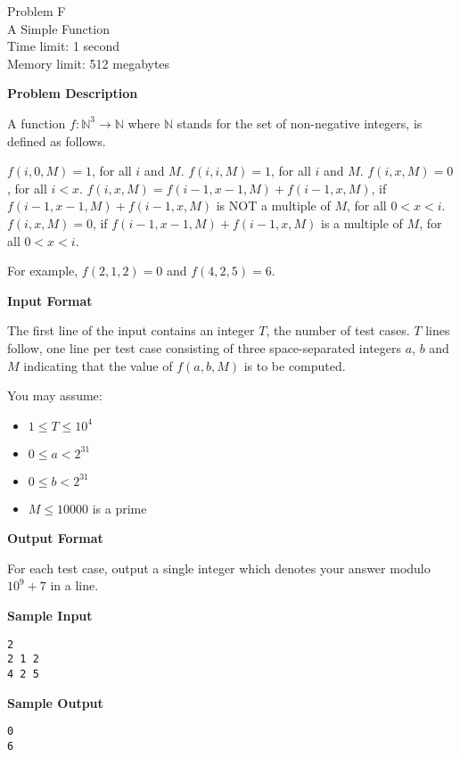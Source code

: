 \begin{center}
    {\LARGE Problem F}\vspace{1mm}\\
    {\Large A Simple Function}\\
    {Time limit: 1 second}\\
    {Memory limit: 512 megabytes}
\end{center}

\textbf{\large Problem Description}

A function $f:\mathbb{N}^{3} \to \mathbb{N}$ where $\mathbb{N}$ stands for the set of non-negative integers, is defined as follows.

\begin{outline}
	\1 $f(i, 0, M)=1$, for all $i$ and $M$.
	\1 $f(i, i, M)=1$, for all $i$ and $M$.
	\1 $f(i, x, M)=0$, for all $i < x$.
	\1 $f(i, x, M)=f(i-1, x-1, M)+f(i-1, x, M)$, if $f(i-1, x-1, M)+f(i-1, x, M)$ is NOT a multiple of $M$, for all $0 < x < i$.
	\1 $f(i, x, M)=0$, if $f(i-1, x-1, M)+f(i-1, x, M)$ is a multiple of $M$, for all $0 < x < i$.
\end{outline}

For example, $f(2, 1, 2) = 0$ and $f(4, 2, 5) = 6$.

\textbf{\large Input Format}

The first line of the input contains an integer $T$, the number of test cases. $T$ lines follow, one line per test case consisting of three space-separated integers $a$, $b$ and $M$ indicating that the value of $f(a, b, M)$ is to be computed.

You may assume:
\begin{itemize}
    \tightlist{}
    \item $1 \le T \le 10^4$
    \item $0 \leq a < 2^{31}$
    \item $0 \leq b < 2^{31}$
    \item $M \leq 10000$ is a prime
\end{itemize}

\textbf{\large Output Format}

For each test case, output a single integer which denotes your answer modulo $10^{9}+7$ in a line.

\textbf{\large Sample Input}

\begin{verbatim}
2
2 1 2
4 2 5
\end{verbatim}

\textbf{\large Sample Output}

\begin{verbatim}
0
6
\end{verbatim}

